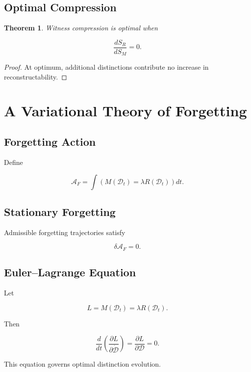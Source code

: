 \documentclass[12pt,oneside]{book}
\theoremstyle{plain} \newtheorem{theorem}{Theorem}[chapter] \newtheorem{lemma}[theorem]{Lemma} \newtheorem{proposition}[theorem]{Proposition} \newtheorem{corollary}[theorem]{Corollary}
\theoremstyle{definition} \newtheorem{definition}[theorem]{Definition} \newtheorem{axiom}[theorem]{Axiom} \newtheorem{construction}[theorem]{Construction}
\theoremstyle{remark} \newtheorem{remark}[theorem]{Remark} \newtheorem{example}[theorem]{Example}
\newcommand{\D}{\mathcal{D}} \newcommand{\R}{\mathcal{R}} \newcommand{\F}{\mathcal{F}} \newcommand{\U}{\mathcal{U}} \newcommand{\M}{\mathcal{M}} \newcommand{\G}{\Gamma}
\begin{document}
\section{Optimal Compression}

\begin{theorem}

Witness compression is optimal when

\[
\frac{dS_R}{dS_M}=0.
\]

\end{theorem}

\begin{proof}

At optimum, additional distinctions contribute no increase in reconstructability.

\end{proof}

\chapter{A Variational Theory of Forgetting}

\section{Forgetting Action}

Define

\[
\mathcal A_F
=
\int
\left(
M(\D_t)
=
\lambda
R(\D_t)
\right)
dt.
\]

\section{Stationary Forgetting}

Admissible forgetting trajectories satisfy

\[
\delta
\mathcal A_F
=
0. 

\]

\section{Euler--Lagrange Equation}

Let

\[
L
=
M(\D_t)
=
\lambda R(\D_t).
\]

Then

\[
\frac{d}{dt}
\left(
\frac{\partial L}
{\partial \dot{\D}}
\right)
=
\frac{\partial L}
{\partial \D}
=
0. 

\]

This equation governs optimal distinction evolution.
\end{document}
